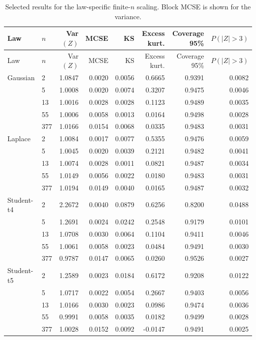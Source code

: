 \begin{longtable}{llrrrrrr}
\caption{Selected results for the law-specific finite-$n$ scaling. Block MCSE is shown for the variance.}\label{tab:selected-results}\\
\toprule
Law & $n$ & Var$(Z)$ & MCSE & KS & Excess kurt. & Coverage 95\% & $P(|Z|>3)$ \\
\midrule
\endfirsthead
\toprule
Law & $n$ & Var$(Z)$ & MCSE & KS & Excess kurt. & Coverage 95\% & $P(|Z|>3)$ \\
\midrule
\endhead
Gaussian & 2 & 1.0847 & 0.0020 & 0.0056 & 0.6665 & 0.9391 & 0.0082 \\
 & 5 & 1.0008 & 0.0020 & 0.0074 & 0.3207 & 0.9475 & 0.0046 \\
 & 13 & 1.0016 & 0.0028 & 0.0028 & 0.1123 & 0.9489 & 0.0035 \\
 & 55 & 1.0006 & 0.0058 & 0.0013 & 0.0164 & 0.9498 & 0.0028 \\
 & 377 & 1.0166 & 0.0154 & 0.0068 & 0.0335 & 0.9483 & 0.0031 \\
\addlinespace
Laplace & 2 & 1.0084 & 0.0017 & 0.0077 & 0.5355 & 0.9476 & 0.0059 \\
 & 5 & 1.0045 & 0.0020 & 0.0039 & 0.2121 & 0.9482 & 0.0041 \\
 & 13 & 1.0074 & 0.0028 & 0.0011 & 0.0821 & 0.9487 & 0.0034 \\
 & 55 & 1.0149 & 0.0056 & 0.0022 & 0.0180 & 0.9483 & 0.0031 \\
 & 377 & 1.0194 & 0.0149 & 0.0040 & 0.0165 & 0.9487 & 0.0032 \\
\addlinespace
Student-t4 & 2 & 2.2672 & 0.0040 & 0.0879 & 0.6256 & 0.8200 & 0.0488 \\
 & 5 & 1.2691 & 0.0024 & 0.0242 & 0.2548 & 0.9179 & 0.0101 \\
 & 13 & 1.0708 & 0.0030 & 0.0064 & 0.1104 & 0.9411 & 0.0046 \\
 & 55 & 1.0061 & 0.0058 & 0.0023 & 0.0484 & 0.9491 & 0.0030 \\
 & 377 & 0.9787 & 0.0147 & 0.0065 & 0.0260 & 0.9526 & 0.0027 \\
\addlinespace
Student-t5 & 2 & 1.2589 & 0.0023 & 0.0184 & 0.6172 & 0.9208 & 0.0122 \\
 & 5 & 1.0717 & 0.0022 & 0.0054 & 0.2667 & 0.9403 & 0.0056 \\
 & 13 & 1.0166 & 0.0030 & 0.0023 & 0.0986 & 0.9474 & 0.0036 \\
 & 55 & 0.9991 & 0.0058 & 0.0035 & 0.0182 & 0.9499 & 0.0028 \\
 & 377 & 1.0028 & 0.0152 & 0.0092 & -0.0147 & 0.9491 & 0.0025 \\

\end{longtable}
